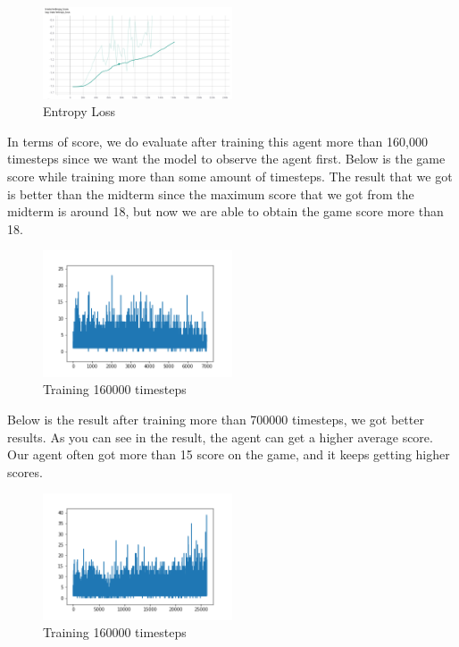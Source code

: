 \documentclass{article}
\begin{document}
\begin{figure}[h]
    \caption{Entropy Loss}
    \centering
    \includegraphics[width=0.5\textwidth]{EL.png}
\end{figure}

In terms of score, we do evaluate after training this agent more than 160,000 timesteps since we want the model to observe the agent first. Below is the game score while training more than some amount of timesteps. The result that we got is better than the midterm since the maximum score that we got from the midterm is around 18, but now we are able to obtain the game score more than 18. \par 

\begin{figure}[H]
    \caption{Training 160000 timesteps}
    \centering
    \includegraphics[width=0.5\textwidth]{PPO_Score.png}
\end{figure}

Below is the result after training more than 700000 timesteps, we got better results. As you can see in the result, the agent can get a higher average score. Our agent often got more than 15 score on the game, and it keeps getting higher scores. \par 

\begin{figure}[H]
    \caption{Training 160000 timesteps}
    \centering
    \includegraphics[width=0.5\textwidth]{Final_Score.png}
\end{figure}
\end{document}
